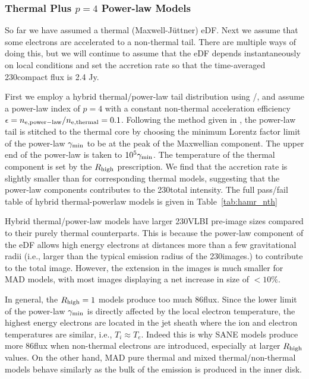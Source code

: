 \subsubsection{Thermal Plus \texorpdfstring{$p = 4$}{p=4} Power-law Models}

So far we have assumed a thermal (Maxwell-J{\"u}ttner) eDF.  Next we assume that some electrons are accelerated to a non-thermal tail.  There are multiple ways of doing this, but we will continue to assume that the eDF depends instantaneously on local conditions and set the accretion rate so that the time-averaged 230\GHz compact flux is 2.4 Jy.

First we employ a hybrid thermal/power-law tail distribution using \hamr/\bhoss, and assume a power-law index of $p=4$ with a constant non-thermal acceleration efficiency $\epsilon=n_{\rm e, power-law}/n_{\rm e, thermal}=0.1$. Following the method given in \citet{Chatterjee2021}, the power-law tail is stitched to the thermal core by choosing the minimum Lorentz factor limit of the power-law $\gamma_{\rm min}$ to be at the peak of the Maxwellian component. The upper end of the power-law is taken to $10^5 \gamma_{\rm min}$.  The temperature of the thermal component is set by the $R_\mathrm{high}$ prescription.  We find that the accretion rate is slightly smaller than for corresponding thermal models, suggesting that the power-law components contributes to the 230\GHz total intensity. The full pass/fail table of hybrid thermal-powerlaw models is given in Table~\ref{tab:hamr_nth}


Hybrid thermal/power-law models have larger 230\GHz VLBI pre-image sizes compared to their purely thermal counterparts. This is because the power-law component of the eDF allows high energy electrons at distances more than a few gravitational radii (i.e., larger than the typical emission radius of the 230\GHz images.) to contribute to the total image. However, the extension in the images is much smaller for MAD models, with most images displaying a net increase in size of $<10\%$.


In general, the $R_{\rm high}=1$ models produce too much 86\GHz flux. Since the lower limit of the power-law $\gamma_{\rm min}$ is directly affected by the local electron temperature, the highest energy electrons are located in the jet sheath where the ion and electron temperatures are similar, i.e., $T_i\approx T_e$. Indeed this is why SANE models produce more 86\GHz flux when non-thermal electrons are introduced, especially at larger $R_{\rm high}$ values. On the other hand, MAD pure thermal and mixed thermal/non-thermal models behave similarly as the bulk of the emission is produced in the inner disk.

